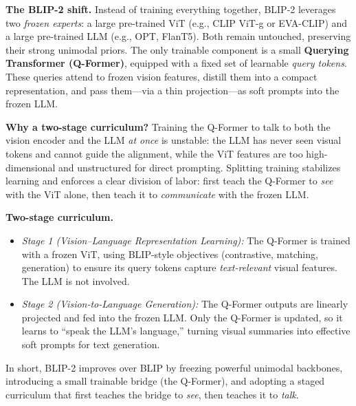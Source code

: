 \begin{enrichment}
\begin{enrichment}
        \noindent\textbf{The BLIP-2 shift.} Instead of training everything together, BLIP-2 leverages two \emph{frozen experts}: a large pre-trained ViT (e.g., CLIP ViT-g or EVA-CLIP) and a large pre-trained LLM (e.g., OPT, FlanT5). Both remain untouched, preserving their strong unimodal priors. The only trainable component is a small \textbf{Querying Transformer (Q-Former)}, equipped with a fixed set of learnable \emph{query tokens}. These queries attend to frozen vision features, distill them into a compact representation, and pass them—via a thin projection—as soft prompts into the frozen LLM.
        
        \noindent\textbf{Why a two-stage curriculum?} Training the Q-Former to talk to both the vision encoder and the LLM \emph{at once} is unstable: the LLM has never seen visual tokens and cannot guide the alignment, while the ViT features are too high-dimensional and unstructured for direct prompting. Splitting training stabilizes learning and enforces a clear division of labor: first teach the Q-Former to \emph{see} with the ViT alone, then teach it to \emph{communicate} with the frozen LLM.
        
        \noindent\textbf{Two-stage curriculum.} 
        \begin{itemize}
            \item \emph{Stage 1 (Vision--Language Representation Learning):} The Q-Former is trained with a frozen ViT, using BLIP-style objectives (contrastive, matching, generation) to ensure its query tokens capture \emph{text-relevant} visual features. The LLM is not involved.
            \item \emph{Stage 2 (Vision-to-Language Generation):} The Q-Former outputs are linearly projected and fed into the frozen LLM. Only the Q-Former is updated, so it learns to “speak the LLM’s language,” turning visual summaries into effective soft prompts for text generation.
        \end{itemize}
        
        \noindent In short, BLIP-2 improves over BLIP by freezing powerful unimodal backbones, introducing a small trainable bridge (the Q-Former), and adopting a staged curriculum that first teaches the bridge to \emph{see}, then teaches it to \emph{talk}.
        

\end{enrichment}
\end{enrichment}

